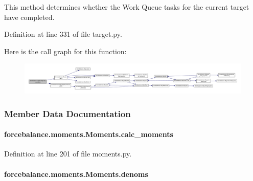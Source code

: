 This method determines whether the Work Queue tasks for the current target have completed. 



Definition at line 331 of file target.\-py.



Here is the call graph for this function\-:\nopagebreak
\begin{figure}[H]
\begin{center}
\leavevmode
\includegraphics[width=350pt]{classforcebalance_1_1target_1_1Target_af6099ec09486213869dba2491bd8ea04_cgraph}
\end{center}
\end{figure}




\subsubsection{Member Data Documentation}
\hypertarget{classforcebalance_1_1moments_1_1Moments_a0b71c05c5ddbea8f0990879abd604aec}{
\paragraph[{calc\-\_\-moments}]{\setlength{\rightskip}{0pt plus 5cm}forcebalance.\-moments.\-Moments.\-calc\-\_\-moments}}\label{classforcebalance_1_1moments_1_1Moments_a0b71c05c5ddbea8f0990879abd604aec}


Definition at line 201 of file moments.\-py.

\hypertarget{classforcebalance_1_1moments_1_1Moments_af8711c91b434e0c8a54a6e4c96e58f3b}{
\paragraph[{denoms}]{\setlength{\rightskip}{0pt plus 5cm}forcebalance.\-moments.\-Moments.\-denoms}}\label{classforcebalance_1_1moments_1_1Moments_af8711c91b434e0c8a54a6e4c96e58f3b}


